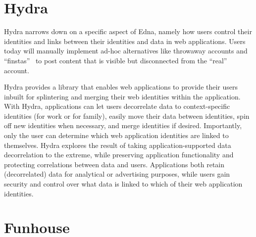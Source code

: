 \begin{comment}

Edna is complementary to existing data protection mechanisms. For example, we
combine Edna with an encrypted database to achieve stronger guarantees.
Ednacrypt simultaneously protects against database server compromises even for
unsealed data and adds Edna's protections for sealed data to encrypted
databases, which have no built-in support for removing sensitive data without
breaking the application.

To investigate the need for Edna as a new system, we tried to realize Edna's
functionality atop Qapla~\cite{qapla}, a framework that rewrites SQL queries to
conform to access control policies. We found that Qapla requires invasive
application changes, its abstractions are awkward for sealing and revealing, and
Qapla's query rewriting slows down common queries.


\end{comment}


\section{Hydra}

Hydra narrows down on a specific aspect of Edna, namely how users control their
identities and links between their identities and data in web applications.
Users today will manually implement ad-hoc alternatives like throwaway accounts
and ``finstas''~\cite{reddit:throwaway, nytimes:finsta} to post content that is
visible but disconnected from the ``real'' account. 

Hydra provides a library that enables web applications to provide their
users inbuilt for splintering and merging their web identities within the
application. With Hydra, applications can let users decorrelate data to
context-specific identities (\eg for work or for family), easily
move their data between identities, spin off new identities when necessary, and
merge identities if desired. Importantly, only the user can determine which
web application identities are linked to themselves.
%
Hydra explores the result of taking application-supported data
decorrelation to the extreme, while preserving application functionality and
protecting correlations between data and users. Applications both retain
(decorrelated) data for \eg analytical or advertising purposes, while users gain
security and control over what data is linked to which of their web application
identities.



\section{Funhouse}
